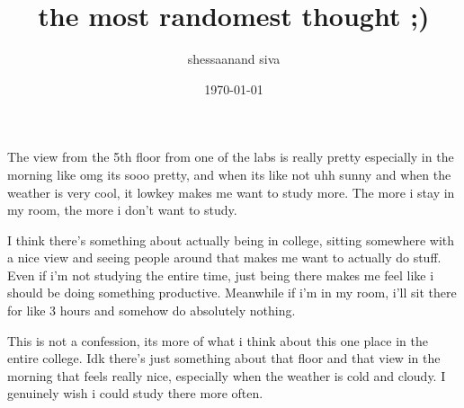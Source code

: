 \documentclass[12pt]{article}
\title{the most randomest thought ;)}
\author{shessaanand siva}
\date{\today}
\begin{document}
\maketitle

The view from the 5th floor from one of the labs is really pretty especially in the morning like omg its sooo pretty, and when its like not uhh sunny and when the weather is very cool, it lowkey makes me want to study more. The more i stay in my room, the more i don't want to study.

I think there's something about actually being in college, sitting somewhere with a nice view and seeing people around that makes me want to actually do stuff. Even if i'm not studying the entire time, just being there makes me feel like i should be doing something productive. Meanwhile if i'm in my room, i'll sit there for like 3 hours and somehow do absolutely nothing.

This is not a confession, its more of what i think about this one place in the entire college. Idk there's just something about that floor and that view in the morning that feels really nice, especially when the weather is cold and cloudy. I genuinely wish i could study there more often.
\end{document}
